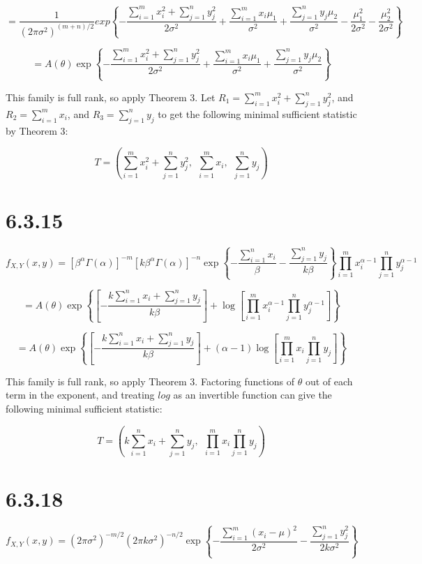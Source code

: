 \documentclass{article}
\begin{document}
\[
=\frac{1}{(2\pi\sigma^2)^{(m+n)/2}}
exp \left\{ -\frac{\sum_{i=1}^m x_i^2 + \sum_{j=1}^n y_j^2}{2\sigma^2} +
\frac{\sum_{i=1}^m x_i\mu_1}{\sigma^2} + \frac{\sum_{j=1}^n y_j\mu_2}{\sigma^2}
 - \frac{\mu_1^2}{2\sigma^2} - \frac{\mu_2^2}{2\sigma^2} \right\}
\]

\[
= A(\theta) 
\exp \left\{ -\frac{\sum_{i=1}^m x_i^2 + \sum_{j=1}^n y_j^2}{2\sigma^2} +
\frac{\sum_{i=1}^m x_i\mu_1}{\sigma^2} + \frac{\sum_{j=1}^n y_j\mu_2}{\sigma^2}
\right\}
\]

This family is full rank, so apply Theorem 3. 
Let $R_1 = \sum_{i=1}^m x_i^2 + \sum_{j=1}^n y_j^2$, and
$R_2 = \sum_{i=1}^m x_i$, and $R_3 = \sum_{j=1}^n y_j$ to get the following
minimal sufficient statistic by Theorem 3:

\[
T = \left(\sum_{i=1}^m x_i^2 + \sum_{j=1}^n y_j^2, \ \ 
\sum_{i=1}^m x_i, \ \ \sum_{j=1}^n y_j\right)
\]

\section{6.3.15}

\[
f_{X,Y}(x,y) = 
[\beta^{\alpha}\Gamma(\alpha)]^{-m}[k\beta^{\alpha}\Gamma(\alpha)]^{-n}
\exp \left\{-\frac{\sum_{i=1}^n x_i}{\beta} 
-\frac{\sum_{j=1}^n y_j}{k\beta}\right\}
\prod_{i=1}^mx_i^{\alpha-1}\prod_{j=1}^ny_j^{\alpha-1}
\]

\[
= A(\theta) 
\exp \left\{ \left[-\frac{k\sum_{i=1}^n x_i + \sum_{j=1}^n y_j}{k\beta}
\right] + \log \left[ \prod_{i=1}^mx_i^{\alpha-1}\prod_{j=1}^ny_j^{\alpha-1}
\right] \right\}
\]

\[
= A(\theta) 
\exp \left\{ \left[-\frac{k\sum_{i=1}^n x_i + \sum_{j=1}^n y_j}{k\beta}
\right] + (\alpha-1)\log \left[ \prod_{i=1}^mx_i\prod_{j=1}^ny_j
\right] \right\}
\]

This family is full rank, so apply Theorem 3.
Factoring functions of $\theta$ out of each term in the exponent, and treating
$log$ as an invertible function can give the following minimal sufficient
statistic:

\[
T = \left( k\sum_{i=1}^n x_i + \sum_{j=1}^n y_j, 
\ \ \prod_{i=1}^mx_i\prod_{j=1}^ny_j \right)
\]

\section{6.3.18}

\[
f_{X,Y}(x,y) = (2\pi\sigma^2)^{-m/2}(2\pi k\sigma^2)^{-n/2}
\exp \left\{-\frac{\sum_{i=1}^m(x_i-\mu)^2}{2\sigma^2}
-\frac{\sum_{j=1}^n y_j^2}{2k\sigma^2} \right\}
\]
\end{document}
